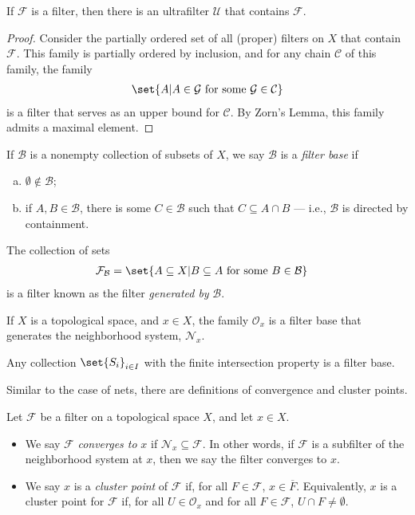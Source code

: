 \documentclass[11pt]{mypackage}
\begin{document}
\begin{theorem}
  If $\mathcal{F}$ is a filter, then there is an ultrafilter $\mathcal{U}$ that contains $\mathcal{F}$.
\end{theorem}
\begin{proof}
  Consider the partially ordered set of all (proper) filters on $X$ that contain $\mathcal{F}$. This family is partially ordered by inclusion, and for any chain $\mathcal{C}$ of this family, the family 
  \begin{align*}
    \set{A | A\in \mathcal{G}\text{ for some }\mathcal{G}\in \mathcal{C}}
  \end{align*}
   is a filter that serves as an upper bound for $\mathcal{C}$. By Zorn's Lemma, this family admits a maximal element.
\end{proof}
\begin{definition}
  If $\mathcal{B}$ is a nonempty collection of subsets of $X$, we say $\mathcal{B}$ is a \textit{filter base} if
  \begin{enumerate}[(a)]
    \item $\emptyset\notin \mathcal{B}$;
    \item if $A,B\in \mathcal{B}$, there is some $C\in \mathcal{B}$ such that $C\subseteq A\cap B$ --- i.e., $\mathcal{B}$ is directed by containment.
  \end{enumerate}
  The collection of sets
  \begin{align*}
    \mathcal{F}_{\mathcal{B}} &= \set{A\subseteq X | B\subseteq A\text{ for some }B\in \mathcal{B}}
  \end{align*}
  is a filter known as the filter \textit{generated by} $\mathcal{B}$.
\end{definition}
\begin{example}
  If $X$ is a topological space, and $x\in X$, the family $\mathcal{O}_{x}$ is a filter base that generates the neighborhood system, $\mathcal{N}_{x}$.
\end{example}
\begin{proposition}
  Any collection $\set{S_i}_{i\in I}$ with the finite intersection property is a filter base.
\end{proposition}
Similar to the case of nets, there are definitions of convergence and cluster points.
\begin{definition}
  Let $\mathcal{F}$ be a filter on a topological space $X$, and let $x\in X$.
  \begin{itemize}
    \item We say $\mathcal{F}$ \textit{converges to} $x$ if $\mathcal{N}_{x}\subseteq \mathcal{F}$. In other words, if $\mathcal{F}$ is a subfilter of the neighborhood system at $x$, then we say the filter converges to $x$.
    \item We say $x$ is a \textit{cluster point} of $\mathcal{F}$ if, for all $F\in \mathcal{F}$, $x\in \overline{F}$. Equivalently, $x$ is a cluster point for $\mathcal{F}$ if, for all $U\in \mathcal{O}_{x}$ and for all $F\in \mathcal{F}$, $U\cap F \neq \emptyset$.
  \end{itemize}
\end{definition}
\end{document}
